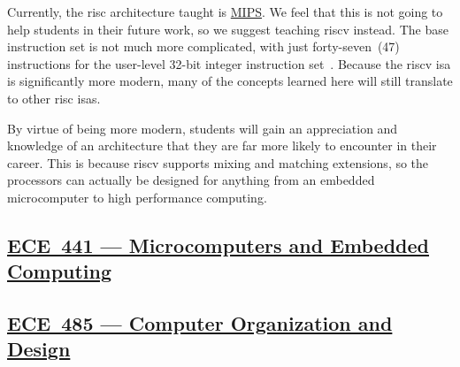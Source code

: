 Currently, the \Gls{risc} architecture taught is \href{https://en.wikipedia.org/wiki/MIPS_architecture}{MIPS}.
We feel that this is not going to help students in their future work, so we suggest teaching \Gls{riscv} instead.
The base instruction set is not much more complicated, with just forty-seven~(47) instructions for the user-level 32-bit integer instruction set~\cite[pp.~9--26]{riscvISASpec}.
Because the \Gls{riscv} \Gls{isa} is significantly more modern, many of the concepts learned here will still translate to other \Gls{risc} \Glspl{isa}.

By virtue of being more modern, students will gain an appreciation and knowledge of an architecture that they are far more likely to encounter in their career.
This is because \Gls{riscv} supports mixing and matching extensions, so the processors can actually be designed for anything from an embedded microcomputer to high performance computing.

\subsection{\href{http://bulletin.iit.edu/search/?P=ECE 441}{ECE~441 --- Microcomputers and Embedded Computing}}\label{sec:ECE_441}

\subsection{\href{http://bulletin.iit.edu/search/?P=ECE 485}{ECE~485 --- Computer Organization and Design}}\label{sec:ECE_485}

